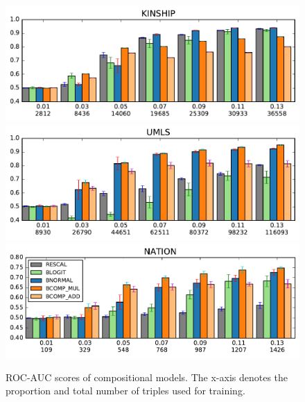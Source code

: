 \begin{figure}[t]
	\centering
	\includegraphics[width=\linewidth]{images/comp_training_error_kinship_small.pdf}
	\includegraphics[width=\linewidth]{images/comp_training_error_umls_small.pdf}			
	\includegraphics[width=\linewidth]{images/comp_training_error_nation_small.pdf}				
	\caption{\label{fig:r_vs_br} ROC-AUC scores of compositional models. 
	The x-axis denotes the proportion and total number of triples used for training. %
}
\end{figure} 


